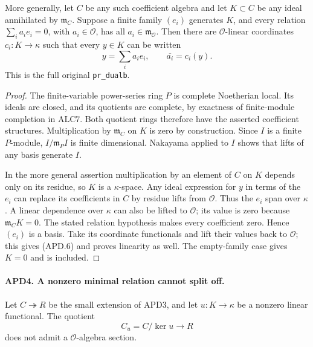 More generally, let \(C\) be any such coefficient algebra and
let \(K\subset C\) be any ideal annihilated by
\(\mathfrak m_C\).  Suppose a finite family \((e_i)\)
generates \(K\), and every relation
\(\sum_i a_ie_i=0\), with \(a_i\in\mathcal O\), has all
\(a_i\in\mathfrak m_{\mathcal O}\).  Then there are
\(\mathcal O\)-linear coordinates \(c_i:K\to\kappa\) such
that every \(y\in K\) can be written
\[
 y=\sum_i a_ie_i,\qquad \overline{a_i}=c_i(y).
                                                               \tag{APD.6}
\]
This is the full original \texttt{pr\_dualb}.

\begin{proof}
The finite-variable power-series ring \(P\) is complete
Noetherian local.  Its ideals are closed, and its quotients are
complete, by exactness of finite-module completion in ALC7.
Both quotient rings therefore have the asserted coefficient
structures.  Multiplication by \(\mathfrak m_C\) on \(K\)
is zero by construction.  Since \(I\) is a finite \(P\)-module,
\(I/\mathfrak m_PI\) is finite dimensional.  Nakayama applied
to \(I\) shows that lifts of any basis generate \(I\).

In the more general assertion multiplication by an element of \(C\)
on \(K\) depends only on its residue, so \(K\) is a
\(\kappa\)-space.  Any ideal expression for \(y\) in terms
of the \(e_i\) can replace its coefficients in \(C\) by
residue lifts from \(\mathcal O\).  Thus the \(e_i\) span
over \(\kappa\).  A linear dependence over \(\kappa\)
can also be lifted to \(\mathcal O\); its value is zero because
\(\mathfrak m_CK=0\).  The stated relation hypothesis makes
every coefficient zero.  Hence \((e_i)\) is a basis.
Take its coordinate functionals and lift their values back to
\(\mathcal O\); this gives (APD.6) and proves linearity as well.
The empty-family case gives \(K=0\) and is included.
\end{proof}

\paragraph{APD4. A nonzero minimal relation cannot split off.}
\label{claim:APD4}
Let \(C\twoheadrightarrow R\) be the small extension of APD3,
and let \(u:K\to\kappa\) be a nonzero linear functional.
The quotient
\[
 C_u=C/\ker u\longrightarrow R                            \tag{APD.7}
\]
does not admit a \(\mathcal O\)-algebra section.

